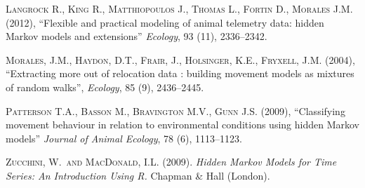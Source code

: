 \documentclass[]{article}
\begin{document}
\begin{thebibliography}{}

\textsc{Langrock R., King R., Matthiopoulos J., Thomas L., Fortin D., Morales J.M.} (2012),
``Flexible and practical modeling of animal telemetry data: hidden Markov models and extensions''
\textit{Ecology}, 93 (11), 2336--2342.

\textsc{Morales, J.M., Haydon, D.T., Frair, J., Holsinger, K.E., Fryxell, J.M.} (2004),
``Extracting more out of relocation data : building movement models as mixtures of random walks'',
\textit{Ecology}, 85 (9), 2436--2445.

\textsc{Patterson T.A., Basson M., Bravington M.V., Gunn J.S.} (2009),
``Classifying movement behaviour in relation to environmental conditions using hidden Markov models''
\textit{Journal of Animal Ecology}, 78 (6), 1113--1123.

\textsc{Zucchini, W.\ and MacDonald, I.L.} (2009).
{\em Hidden Markov Models for Time Series: An Introduction Using R.}
Chapman \& Hall (London).

\end{thebibliography}
\end{document}
